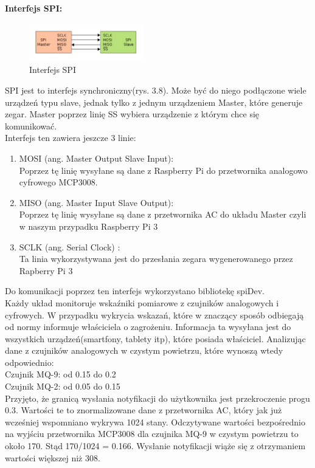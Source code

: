 \paragraph{Interfejs SPI:}
\begin{figure}[ht]
	\centering
	\includegraphics[width=5cm]{SPI.png}
	\caption{Interfejs SPI \cite{spi}}
\end{figure}
SPI jest to interfejs synchroniczny(rys. 3.8). Może być do niego podłączone wiele urządzeń typu slave, jednak tylko z jednym urządzeniem Master, które generuje zegar. Master poprzez linię SS wybiera urządzenie z którym chce się komunikować. \\
Interfejs ten zawiera jeszcze 3 linie:
\begin{enumerate} 
\item MOSI (ang. Master Output Slave Input): \\
Poprzez tę linię wysyłane są dane z Raspberry Pi do przetwornika analogowo cyfrowego MCP3008.
\item MISO (ang. Master Input Slave Output):\\
Poprzez tę linię wysyłane są dane z przetwornika AC do układu Master czyli w naszym przypadku Raspberry Pi 3
\item SCLK (ang. Serial Clock) :\\
Ta linia wykorzystywana jest do przesłania zegara wygenerowanego przez Rapberry Pi 3
\end{enumerate}
Do komunikacji poprzez ten interfejs wykorzystano bibliotekę spiDev. \\
Każdy układ monitoruje wskaźniki pomiarowe z czujników analogowych i cyfrowych. W przypadku wykrycia wskazań, które w znaczący sposób odbiegają od normy informuje właściciela o zagrożeniu. Informacja ta wysyłana jest do wszystkich urządzeń(smartfony, tablety itp), które posiada właściciel.  Analizując dane z czujników analogowych w czystym powietrzu, które wynoszą wtedy odpowiednio:\\
Czujnik MQ-9: od 0.15 do 0.2\\
Czujnik MQ-2: od 0.05 do 0.15\\
Przyjęto, że granicą wysłania notyfikacji do użytkownika jest przekroczenie progu 0.3. Wartości te to znormalizowane dane z przetwornika AC, który jak już wcześniej wspomniano wykrywa 1024 stany. Odczytywane wartości bezpośrednio na wyjściu przetwornika MCP3008 dla czujnika MQ-9 w czystym powietrzu to około 170. Stąd 170/1024 = 0.166. Wysłanie notyfikacji wiąże się z otrzymaniem wartości większej niż 308.
